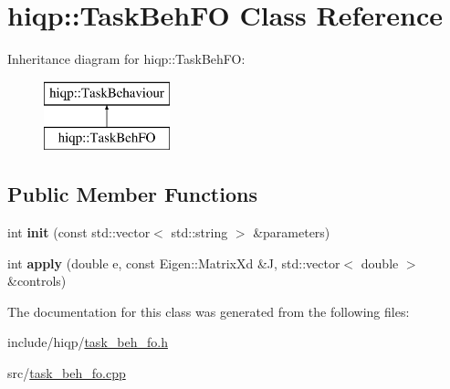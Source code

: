 \hypertarget{classhiqp_1_1TaskBehFO}{\section{hiqp\-:\-:Task\-Beh\-F\-O Class Reference}
\label{classhiqp_1_1TaskBehFO}
}
Inheritance diagram for hiqp\-:\-:Task\-Beh\-F\-O\-:\begin{figure}[H]
\begin{center}
\leavevmode
\includegraphics[height=2.000000cm]{classhiqp_1_1TaskBehFO}
\end{center}
\end{figure}
\subsection*{Public Member Functions}
\begin{DoxyCompactItemize}
\item 
\hypertarget{classhiqp_1_1TaskBehFO_a9eaee2261d1854b355d414e8392286e6}{int {\bfseries init} (const std\-::vector$<$ std\-::string $>$ \&parameters)}\label{classhiqp_1_1TaskBehFO_a9eaee2261d1854b355d414e8392286e6}

\item 
\hypertarget{classhiqp_1_1TaskBehFO_abe51a68d08d4a6886cca42e52d0c2fe8}{int {\bfseries apply} (double e, const Eigen\-::\-Matrix\-Xd \&J, std\-::vector$<$ double $>$ \&controls)}\label{classhiqp_1_1TaskBehFO_abe51a68d08d4a6886cca42e52d0c2fe8}

\end{DoxyCompactItemize}


The documentation for this class was generated from the following files\-:\begin{DoxyCompactItemize}
\item 
include/hiqp/\hyperlink{task__beh__fo_8h}{task\-\_\-beh\-\_\-fo.\-h}\item 
src/\hyperlink{task__beh__fo_8cpp}{task\-\_\-beh\-\_\-fo.\-cpp}\end{DoxyCompactItemize}
